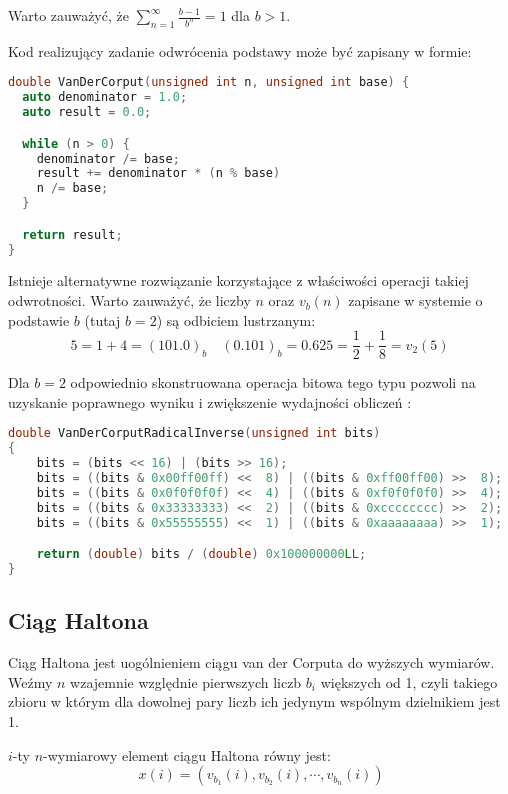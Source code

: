 \documentclass[../main.tex]{subfiles}
\begin{document}
Warto zauważyć, że $\sum_{n=1}^{\infty} \frac{b-1}{b^n} = 1$ dla $b>1$.

Kod realizujący zadanie odwrócenia podstawy może być zapisany w formie:

\begin{lstlisting}[language=c++]
double VanDerCorput(unsigned int n, unsigned int base) {
  auto denominator = 1.0;
  auto result = 0.0;

  while (n > 0) {
    denominator /= base;
    result += denominator * (n % base)
    n /= base;
  }

  return result;
}
\end{lstlisting}

Istnieje alternatywne rozwiązanie korzystające z właściwości operacji takiej odwrotności. Warto zauważyć, że liczby $n$ oraz $v_b(n)$ zapisane w systemie o podstawie $b$ (tutaj $b=2$) są odbiciem lustrzanym:
\[
  5 = 1 + 4 = (101.0)_{b} \quad
  (0.101)_{b} = 0.625 = \frac{1}{2} + \frac{1}{8} = v_2(5)
\]

Dla $b=2$ odpowiednio skonstruowana operacja bitowa tego typu pozwoli na uzyskanie poprawnego wyniku i zwiększenie wydajności obliczeń \cite{dammertz_2012,MultidimensionalSampling}:

\begin{lstlisting}[language=c++]
double VanDerCorputRadicalInverse(unsigned int bits)
{
	bits = (bits << 16) | (bits >> 16);
	bits = ((bits & 0x00ff00ff) <<  8) | ((bits & 0xff00ff00) >>  8);
	bits = ((bits & 0x0f0f0f0f) <<  4) | ((bits & 0xf0f0f0f0) >>  4);
	bits = ((bits & 0x33333333) <<  2) | ((bits & 0xcccccccc) >>  2);
	bits = ((bits & 0x55555555) <<  1) | ((bits & 0xaaaaaaaa) >>  1);

	return (double) bits / (double) 0x100000000LL;
}
\end{lstlisting}

\subsection{Ciąg Haltona}

Ciąg Haltona jest uogólnieniem ciągu van der Corputa do wyższych wymiarów. Weźmy $n$ wzajemnie względnie pierwszych liczb $b_i$ większych od 1, czyli takiego zbioru w którym dla dowolnej pary liczb ich jedynym wspólnym dzielnikiem jest 1.

$i$-ty $n$-wymiarowy element ciągu Haltona równy jest:
\begin{equation}\
x(i) = \left( v_{b_1}(i), v_{b_2}(i), \cdots, v_{b_n}(i) \right) 
\end{equation}
\end{document}
